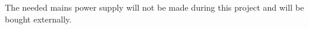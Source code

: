 The needed mains power supply will not be made during this project and will be bought externally.


